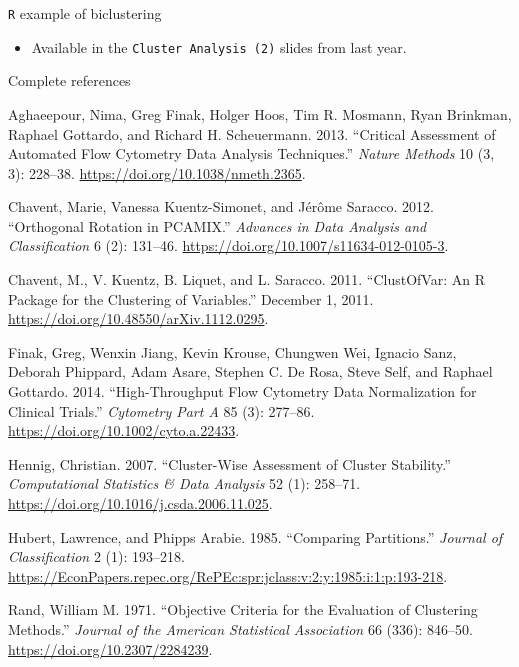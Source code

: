 \documentclass[
  ignorenonframetext,
  aspectratio=169,
]{beamer}
\providecommand{\tightlist}{%
  \setlength{\itemsep}{0pt}\setlength{\parskip}{0pt}}\usepackage{longtable,booktabs,array}
\newlength{\cslhangindent}
\newlength{\cslentryspacingunit} %
\newenvironment{CSLReferences}[2] %
 {%
  \setlength{\parindent}{0pt}
  \ifodd #1
  \let\oldpar\par
  \def\par{\hangindent=\cslhangindent\oldpar}
  \fi
  \setlength{\parskip}{#2\cslentryspacingunit}
 }%
 {}
\begin{document}
\begin{frame}[fragile]{\texttt{R} example of biclustering}
\protect\hypertarget{r-example-of-biclustering}{}
\begin{itemize}
\tightlist
\item
  Available in the \texttt{Cluster\ Analysis\ (2)} slides from last
  year.
\end{itemize}
\end{frame}

\begin{frame}[allowframebreaks]{Complete references}
\protect\hypertarget{complete-references}{}
\hypertarget{refs}{}
\begin{CSLReferences}{1}{0}
\leavevmode{}%
Aghaeepour, Nima, Greg Finak, Holger Hoos, Tim R. Mosmann, Ryan
Brinkman, Raphael Gottardo, and Richard H. Scheuermann. 2013.
{``Critical Assessment of Automated Flow Cytometry Data Analysis
Techniques.''} \emph{Nature Methods} 10 (3, 3): 228--38.
\url{https://doi.org/10.1038/nmeth.2365}.

\leavevmode{}%
Chavent, Marie, Vanessa Kuentz-Simonet, and Jérôme Saracco. 2012.
{``Orthogonal Rotation in {PCAMIX}.''} \emph{Advances in Data Analysis
and Classification} 6 (2): 131--46.
\url{https://doi.org/10.1007/s11634-012-0105-3}.

\leavevmode{}%
Chavent, M., V. Kuentz, B. Liquet, and L. Saracco. 2011.
{``{ClustOfVar}: {An R Package} for the {Clustering} of {Variables}.''}
December 1, 2011. \url{https://doi.org/10.48550/arXiv.1112.0295}.

\leavevmode{}%
Finak, Greg, Wenxin Jiang, Kevin Krouse, Chungwen Wei, Ignacio Sanz,
Deborah Phippard, Adam Asare, Stephen C. De Rosa, Steve Self, and
Raphael Gottardo. 2014. {``High-Throughput Flow Cytometry Data
Normalization for Clinical Trials.''} \emph{Cytometry Part A} 85 (3):
277--86. \url{https://doi.org/10.1002/cyto.a.22433}.

\leavevmode{}%
Hennig, Christian. 2007. {``Cluster-Wise Assessment of Cluster
Stability.''} \emph{Computational Statistics \& Data Analysis} 52 (1):
258--71. \url{https://doi.org/10.1016/j.csda.2006.11.025}.

\leavevmode{}%
Hubert, Lawrence, and Phipps Arabie. 1985. {``Comparing Partitions.''}
\emph{Journal of Classification} 2 (1): 193--218.
\url{https://EconPapers.repec.org/RePEc:spr:jclass:v:2:y:1985:i:1:p:193-218}.

\leavevmode{}%
Rand, William M. 1971. {``Objective {Criteria} for the {Evaluation} of
{Clustering Methods}.''} \emph{Journal of the American Statistical
Association} 66 (336): 846--50. \url{https://doi.org/10.2307/2284239}.

\end{CSLReferences}
\end{frame}
\end{document}
